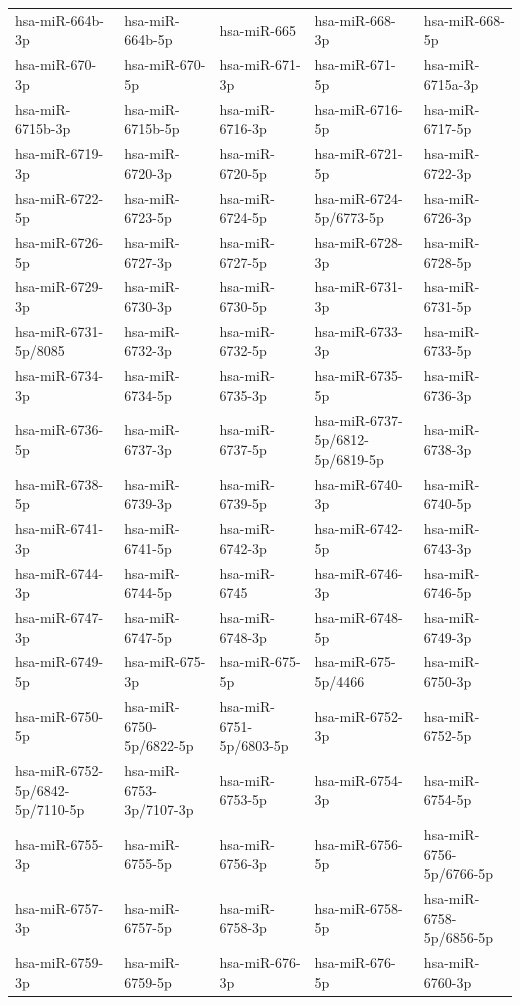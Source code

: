 \begin{longtable}{lllll}
hsa-miR-664b-3p & hsa-miR-664b-5p & hsa-miR-665 & hsa-miR-668-3p & hsa-miR-668-5p \\
hsa-miR-670-3p & hsa-miR-670-5p & hsa-miR-671-3p & hsa-miR-671-5p & hsa-miR-6715a-3p \\
hsa-miR-6715b-3p & hsa-miR-6715b-5p & hsa-miR-6716-3p & hsa-miR-6716-5p & hsa-miR-6717-5p \\
hsa-miR-6719-3p & hsa-miR-6720-3p & hsa-miR-6720-5p & hsa-miR-6721-5p & hsa-miR-6722-3p \\
hsa-miR-6722-5p & hsa-miR-6723-5p & hsa-miR-6724-5p & hsa-miR-6724-5p/6773-5p & hsa-miR-6726-3p \\
hsa-miR-6726-5p & hsa-miR-6727-3p & hsa-miR-6727-5p & hsa-miR-6728-3p & hsa-miR-6728-5p \\
hsa-miR-6729-3p & hsa-miR-6730-3p & hsa-miR-6730-5p & hsa-miR-6731-3p & hsa-miR-6731-5p \\
hsa-miR-6731-5p/8085 & hsa-miR-6732-3p & hsa-miR-6732-5p & hsa-miR-6733-3p & hsa-miR-6733-5p \\
hsa-miR-6734-3p & hsa-miR-6734-5p & hsa-miR-6735-3p & hsa-miR-6735-5p & hsa-miR-6736-3p \\
hsa-miR-6736-5p & hsa-miR-6737-3p & hsa-miR-6737-5p & hsa-miR-6737-5p/6812-5p/6819-5p & hsa-miR-6738-3p \\
hsa-miR-6738-5p & hsa-miR-6739-3p & hsa-miR-6739-5p & hsa-miR-6740-3p & hsa-miR-6740-5p \\
hsa-miR-6741-3p & hsa-miR-6741-5p & hsa-miR-6742-3p & hsa-miR-6742-5p & hsa-miR-6743-3p \\
hsa-miR-6744-3p & hsa-miR-6744-5p & hsa-miR-6745 & hsa-miR-6746-3p & hsa-miR-6746-5p \\
hsa-miR-6747-3p & hsa-miR-6747-5p & hsa-miR-6748-3p & hsa-miR-6748-5p & hsa-miR-6749-3p \\
hsa-miR-6749-5p & hsa-miR-675-3p & hsa-miR-675-5p & hsa-miR-675-5p/4466 & hsa-miR-6750-3p \\
hsa-miR-6750-5p & hsa-miR-6750-5p/6822-5p & hsa-miR-6751-5p/6803-5p & hsa-miR-6752-3p & hsa-miR-6752-5p \\
hsa-miR-6752-5p/6842-5p/7110-5p & hsa-miR-6753-3p/7107-3p & hsa-miR-6753-5p & hsa-miR-6754-3p & hsa-miR-6754-5p \\
hsa-miR-6755-3p & hsa-miR-6755-5p & hsa-miR-6756-3p & hsa-miR-6756-5p & hsa-miR-6756-5p/6766-5p \\
hsa-miR-6757-3p & hsa-miR-6757-5p & hsa-miR-6758-3p & hsa-miR-6758-5p & hsa-miR-6758-5p/6856-5p \\
hsa-miR-6759-3p & hsa-miR-6759-5p & hsa-miR-676-3p & hsa-miR-676-5p & hsa-miR-6760-3p \\

\end{longtable}
